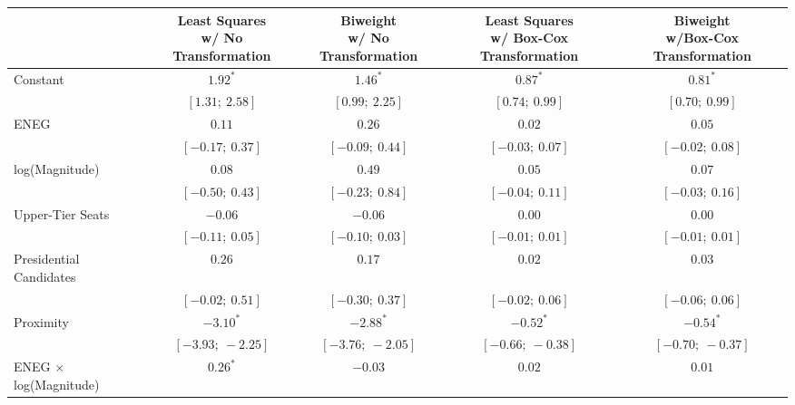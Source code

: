 
\begin{tabular}{l c c c c }
\hline
                                           & \specialcell{Least Squares\\w/ No Transformation} & \specialcell{Biweight\\w/ No Transformation} & \specialcell{Least Squares\\w/ Box-Cox Transformation} & \specialcell{Biweight\\w/Box-Cox Transformation} \\
\hline
Constant                                   & $1.92^{*}$        & $1.46^{*}$        & $0.87^{*}$        & $0.81^{*}$        \\
                                           & $[1.31;\ 2.58]$   & $[0.99;\ 2.25]$   & $[0.74;\ 0.99]$   & $[0.70;\ 0.99]$   \\
ENEG                                       & $0.11$            & $0.26$            & $0.02$            & $0.05$            \\
                                           & $[-0.17;\ 0.37]$  & $[-0.09;\ 0.44]$  & $[-0.03;\ 0.07]$  & $[-0.02;\ 0.08]$  \\
log(Magnitude)                             & $0.08$            & $0.49$            & $0.05$            & $0.07$            \\
                                           & $[-0.50;\ 0.43]$  & $[-0.23;\ 0.84]$  & $[-0.04;\ 0.11]$  & $[-0.03;\ 0.16]$  \\
Upper-Tier Seats                           & $-0.06$           & $-0.06$           & $0.00$            & $0.00$            \\
                                           & $[-0.11;\ 0.05]$  & $[-0.10;\ 0.03]$  & $[-0.01;\ 0.01]$  & $[-0.01;\ 0.01]$  \\
Presidential Candidates                    & $0.26$            & $0.17$            & $0.02$            & $0.03$            \\
                                           & $[-0.02;\ 0.51]$  & $[-0.30;\ 0.37]$  & $[-0.02;\ 0.06]$  & $[-0.06;\ 0.06]$  \\
Proximity                                  & $-3.10^{*}$       & $-2.88^{*}$       & $-0.52^{*}$       & $-0.54^{*}$       \\
                                           & $[-3.93;\ -2.25]$ & $[-3.76;\ -2.05]$ & $[-0.66;\ -0.38]$ & $[-0.70;\ -0.37]$ \\
ENEG $\times$ log(Magnitude)               & $0.26^{*}$        & $-0.03$           & $0.02$            & $0.01$            \\

\end{tabular}
